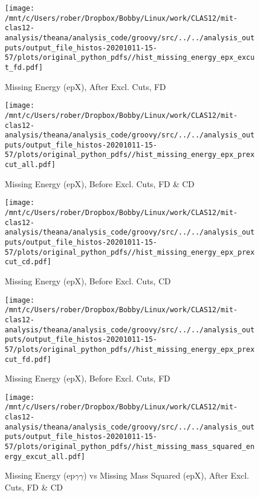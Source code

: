 \documentclass{article}
\begin{document}
\begin{landscape}
\begin{figure}[h]
        \texttt{[image: /mnt/c/Users/rober/Dropbox/Bobby/Linux/work/CLAS12/mit-clas12-analysis/theana/analysis\_code/groovy/src/../../analysis\_outputs/output\_file\_histos-20201011-15-57/plots/original\_python\_pdfs//hist\_missing\_energy\_epx\_excut\_fd.pdf]}
        \captionsetup{textformat=empty,labelformat=blank}
        \caption{Missing Energy (epX), After Excl. Cuts, FD}
    \end{figure}
    \clearpage
    
    \begin{figure}[h]
        \centering

        \texttt{[image: /mnt/c/Users/rober/Dropbox/Bobby/Linux/work/CLAS12/mit-clas12-analysis/theana/analysis\_code/groovy/src/../../analysis\_outputs/output\_file\_histos-20201011-15-57/plots/original\_python\_pdfs//hist\_missing\_energy\_epx\_prexcut\_all.pdf]}
        \captionsetup{textformat=empty,labelformat=blank}
        \caption{Missing Energy (epX), Before Excl. Cuts, FD \& CD}
    \end{figure}
    \clearpage
    
    \begin{figure}[h]
        \centering

        \texttt{[image: /mnt/c/Users/rober/Dropbox/Bobby/Linux/work/CLAS12/mit-clas12-analysis/theana/analysis\_code/groovy/src/../../analysis\_outputs/output\_file\_histos-20201011-15-57/plots/original\_python\_pdfs//hist\_missing\_energy\_epx\_prexcut\_cd.pdf]}
        \captionsetup{textformat=empty,labelformat=blank}
        \caption{Missing Energy (epX), Before Excl. Cuts, CD}
    \end{figure}
    \clearpage
    
    \begin{figure}[h]
        \centering

        \texttt{[image: /mnt/c/Users/rober/Dropbox/Bobby/Linux/work/CLAS12/mit-clas12-analysis/theana/analysis\_code/groovy/src/../../analysis\_outputs/output\_file\_histos-20201011-15-57/plots/original\_python\_pdfs//hist\_missing\_energy\_epx\_prexcut\_fd.pdf]}
        \captionsetup{textformat=empty,labelformat=blank}
        \caption{Missing Energy (epX), Before Excl. Cuts, FD}
    \end{figure}
    \clearpage
    
    \begin{figure}[h]
        \centering

        \texttt{[image: /mnt/c/Users/rober/Dropbox/Bobby/Linux/work/CLAS12/mit-clas12-analysis/theana/analysis\_code/groovy/src/../../analysis\_outputs/output\_file\_histos-20201011-15-57/plots/original\_python\_pdfs//hist\_missing\_mass\_squared\_energy\_excut\_all.pdf]}
        \captionsetup{textformat=empty,labelformat=blank}
        \caption{Missing Energy (ep$\gamma$$\gamma$) vs Missing Mass Squared (epX), After Excl. Cuts, FD \& CD}
    \end{figure}
    \clearpage
    

\end{landscape}
\end{document}
